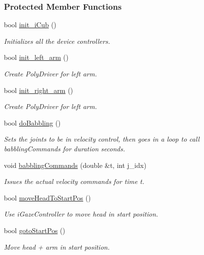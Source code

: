 \subsubsection*{Protected Member Functions}
\begin{DoxyCompactItemize}
\item 
bool \hyperlink{group__babbling_aa4c8a1232df2582bc87b3da1ae0cd6a3}{init\+\_\+i\+Cub} ()
\begin{DoxyCompactList}\small\item\em Initializes all the device controllers. \end{DoxyCompactList}\item 
bool \hyperlink{group__babbling_a0ea0311715915eb771f8aecaec4b9839}{init\+\_\+left\+\_\+arm} ()
\begin{DoxyCompactList}\small\item\em Create Poly\+Driver for left arm. \end{DoxyCompactList}\item 
bool \hyperlink{group__babbling_a222fa43ddad0209a1b216ecc673f6bec}{init\+\_\+right\+\_\+arm} ()
\begin{DoxyCompactList}\small\item\em Create Poly\+Driver for left arm. \end{DoxyCompactList}\item 
bool \hyperlink{group__babbling_a436bdc30395e85a4fb1716ccf4d10cee}{do\+Babbling} ()
\begin{DoxyCompactList}\small\item\em Sets the joints to be in velocity control, then goes in a loop to call {\ttfamily babbling\+Commands} for {\ttfamily duration} seconds. \end{DoxyCompactList}\item 
void \hyperlink{group__babbling_afcb41e76d1e6dc81d3639a91285c87c0}{babbling\+Commands} (double \&t, int j\+\_\+idx)
\begin{DoxyCompactList}\small\item\em Issues the actual velocity commands for time {\ttfamily t}. \end{DoxyCompactList}\item 
bool \hyperlink{group__babbling_a5c0c4032800175a9f2f57fbe9de9037b}{move\+Head\+To\+Start\+Pos} ()
\begin{DoxyCompactList}\small\item\em Use i\+Gaze\+Controller to move head in start position. \end{DoxyCompactList}\item 
bool \hyperlink{group__babbling_ac34e8d2ad42bdf8d98b5dc155d2f42dd}{goto\+Start\+Pos} ()
\begin{DoxyCompactList}\small\item\em Move head + arm in start position. \end{DoxyCompactList}\end{DoxyCompactItemize}
